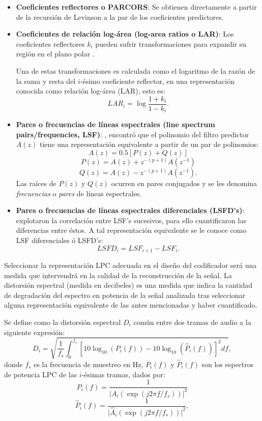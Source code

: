 \begin{itemize} 
	\item \textbf{Coeficientes reflectores o PARCORS}: Se obtienen directamente a partir de la recursión de Levinson a la par de los coeficientes 				predictores.
	\item \textbf{Coeficientes de relación log-área (log-area ratios o LAR)}: Los coeficientes reflectores $k_{i}$ pueden sufrir transformaciones para expandir su región en el plano polar \cite[]{Viswanathan1975}. 
	
	Una de estas transformaciones es calculada como el logaritmo de la razón de la suma y resta del $i$-ésimo coeficiente reflector, en una representación conocida como relación log-área (LAR), esto es: $$LAR_{i}=\log\frac{1+k_{i}}{1-k_{i}}.$$
	\item \textbf{Pares o frecuencias de líneas espectrales (line spectrum pairs/frequencies, LSF)}: \cite{Itakura1975}, encontró que el polinomio del filtro predictor $A(z)$ tiene	una representación equivalente a partir de un par de polinomios:
					$$A(z) = 0.5[P(z)+Q(z)]$$
					$$P(z) = A(z)+z^{-(p+1)}A(z^{-1})$$
					$$Q(z) = A(z)-z^{-(p+1)}A(z^{-1}).$$
			Las raíces de $P(z)$ y $Q(z)$ ocurren en pares conjugados y se les denomina \emph{frecuencias} o \emph{pares} de 						líneas espectrales.			
	\item \textbf{Pares o frecuencias de líneas espectrales diferenciales (LSFD's)}: \cite{Soong1984a} explotaron la correlación entre LSF's sucesivos, para ello cuantificaron las diferencias entre éstos. A tal representación equivalente se le conoce como LSF diferenciales ó LSFD's:
			$$LSFD_{i}=LSF_{i+1}-LSF_{i}.$$
\end{itemize}
Seleccionar la representación LPC adecuada en el diseño del codificador será una medida que intervendrá en la calidad de la reconstrucción de la señal. La distorsión espectral (medida en decibeles) es una medida que indica la cantidad de degradación del espectro en potencia de la señal analizada tras seleccionar alguna representación equivalente de las antes mencionadas y haber cuantificado. 

 Se define como la distorsión espectral $D_{i}$ común entre dos tramas de audio a la siguiente expresión:
 \begin{equation}\label{spectralDisort}
 	D_{i} = \sqrt{ \frac{1}{f_{s}} \int_{0}^{f_{s}} [10\log_{10}(P_{i}(f))-10\log_{10}(\widehat{P}_{i}(f))]^{2} df  },
 \end{equation}
 donde $f_{s}$ es la frecuencia de muestreo en Hz,  $P_{i}(f)$ y $\widehat{P}_{i}(f)$ son los espectros de potencia LPC de las $i$-ésimas tramas, dados por: $$ P_{i}(f)=\frac{1}{\lvert A_{i}(\exp(j2\pi f/f_{s})) \rvert^{2}}$$
 $$ \widehat{P}_{i}(f)=\frac{1}{\lvert \widehat{A}_{i}(\exp(j2\pi f/f_{s})) \rvert^{2}},$$
 
